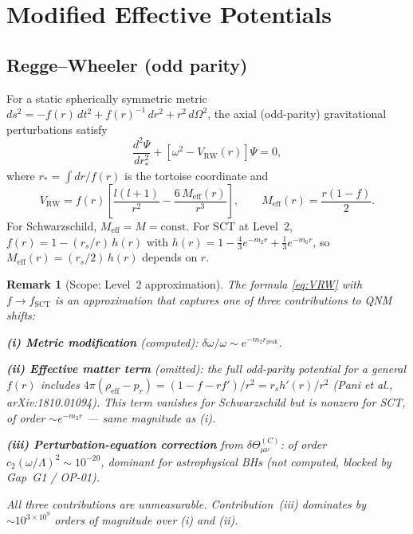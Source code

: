 \documentclass[11pt,a4paper]{article}
\newtheorem{remark}{Remark}
\begin{document}
\section{Modified Effective Potentials}\label{sec:potentials}

\subsection{Regge--Wheeler (odd parity)}

For a static spherically symmetric metric
$ds^2 = -f(r)\,dt^2 + f(r)^{-1}\,dr^2 + r^2\,d\Omega^2$,
the axial (odd-parity) gravitational perturbations satisfy
\begin{equation}
\frac{d^2\Psi}{dr_*^2} + \left[\omega^2 - V_{\mathrm{RW}}(r)\right]\Psi = 0,
\end{equation}
where $r_* = \int dr/f(r)$ is the tortoise coordinate and
\begin{equation}\label{eq:VRW}
V_{\mathrm{RW}} = f(r)\left[\frac{l(l+1)}{r^2} - \frac{6\,M_{\mathrm{eff}}(r)}{r^3}\right],
\qquad M_{\mathrm{eff}}(r) = \frac{r(1-f)}{2}.
\end{equation}
For Schwarzschild, $M_{\mathrm{eff}} = M = \mathrm{const}$.
For SCT at Level~2, $f(r) = 1 - (r_s/r)\,h(r)$ with
$h(r) = 1 - \tfrac{4}{3}e^{-m_2 r} + \tfrac{1}{3}e^{-m_0 r}$,
so $M_{\mathrm{eff}}(r) = (r_s/2)\,h(r)$ depends on $r$.

\begin{remark}[Scope: Level~2 approximation]
The formula \eqref{eq:VRW} with $f \to f_{\mathrm{SCT}}$ is an
\emph{approximation} that captures one of three contributions to QNM shifts:

\textbf{(i) Metric modification} (computed): $\delta\omega/\omega \sim e^{-m_2 r_{\mathrm{peak}}}$.

\textbf{(ii) Effective matter term} (omitted): the full odd-parity potential
for a general $f(r)$ includes $4\pi(\rho_{\mathrm{eff}} - p_r)
= (1 - f - rf')/r^2 = r_s h'(r)/r^2$ (Pani et al., arXiv:1810.01094).
This term vanishes for Schwarzschild but is nonzero for SCT, of order
$\sim e^{-m_2 r}$ --- same magnitude as (i).

\textbf{(iii) Perturbation-equation correction} from
$\delta\Theta^{(C)}_{\mu\nu}$: of order
$c_2(\omega/\Lambda)^2 \sim 10^{-20}$, dominant for astrophysical BHs
(not computed, blocked by Gap~G1 / OP-01).

All three contributions are unmeasurable. Contribution~(iii) dominates
by $\sim 10^{3 \times 10^9}$ orders of magnitude over (i) and (ii).
\end{remark}
\end{document}

